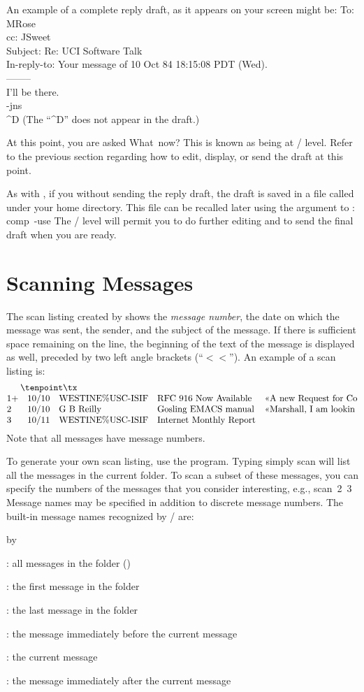 An example of a complete reply draft, as it appears on your screen might be:
\example
    To: MRose\\
    cc: JSweet\\
    Subject: Re: UCI Software Talk\\
    In-reply-to: Your message of 10 Oct 84 18:15:08 PDT (Wed).\\
    --------\\
    I'll be there.\\
    -jns\\
    \^{}D	
\endexample
(The ``\^{}D'' does not appear in the draft.)

At this point, you are asked
\example What\ now?\endexample
This is known as being at \whatnow/ level.
Refer to the previous section regarding how to edit,
display, or send the draft at this point.

As with , 
if you  without sending the reply draft,
the draft is saved in a file called  under your
home directory.
This file can be recalled later using the  argument
to :
\example comp\ -use\endexample
The \whatnow/ level will permit you to do further editing
and to send the final draft when you are ready.

\section{Scanning Messages}
The scan listing created by  shows the {\it message number},
the date on which the message was sent,
the sender,
and the subject of the message.
If there is sufficient space remaining on the line,
the beginning of the text of the message is displayed as well,
preceded by two left angle brackets (``{\tenpoint\tx$<<$\/}'').
An example of a scan listing is:
$$\vbox{\tenpoint\tx\halign{\hfil#&#\hfil&&	\quad#\hfil\cr
1&+&	10/10&	WESTINE\%USC-ISIF&	RFC 916 Now Available&
					<<A new Request for Co\cr
2&&	10/10&	G B Reilly&		Gosling EMACS manual&
					<<Marshall, I am lookin\cr
3&&	10/11&	WESTINE\%USC-ISIF&	Internet Monthly Report&\cr
}}$$
Note that all messages have message numbers.

To generate your own scan listing, use the  program.
Typing simply
\example scan\endexample
will list all the messages in the current folder.
To scan a subset of these messages,
you can specify the numbers of the messages that you consider interesting,
e.g.,
\example scan\ 2\ 3\endexample
Message names may be specified in addition to discrete message numbers.
The built-in message names recognized by \MH/ are:
\smallskip
{\advance\leftskip by\parindent
\item{:}	all messages in the folder ()
\item{:}	the first message in the folder
\item{:}	the last message in the folder
\item{:}	the message immediately before the current message
\item{:}	the current message
\item{:}	the message immediately after the current message
\medskip}
\noindent

